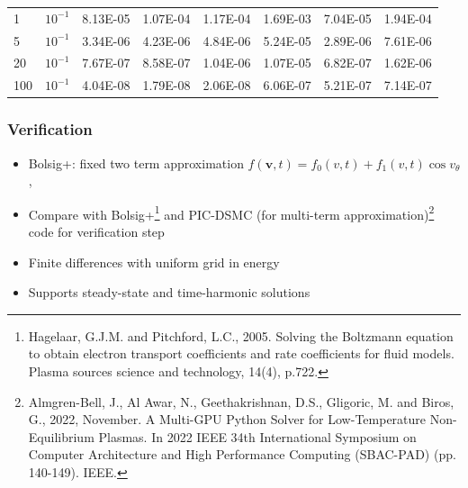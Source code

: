 \documentclass[mathserif, aspectratio=169]{beamer}
\newcommand{\vect}[1]{\boldsymbol{#1}}
\newcommand{\diff}[1]{\, d#1}
\begin{document}
\begin{frame}
\begin{table}[!tbhp]
\begin{tabular}{|p{1cm}|p{1cm}|c|c|c|c|c|c|}
		  1   &	$10^{-1}$ &	8.13E-05 &	1.07E-04 &	1.17E-04 &	1.69E-03 &	7.04E-05 &	1.94E-04\\
		  5   &	$10^{-1}$ &	3.34E-06 &	4.23E-06 &	4.84E-06 &	5.24E-05 &	2.89E-06 &	7.61E-06\\
		  20  &	$10^{-1}$ &	7.67E-07 &	8.58E-07 &	1.04E-06 &	1.07E-05 &	6.82E-07 &	1.62E-06\\
		  100 &	$10^{-1}$ &	4.04E-08 &	1.79E-08 &	2.06E-08 &	6.06E-07 &	5.21E-07 &	7.14E-07\\
		  \hline
		\end{tabular}
	  \end{table}
\end{frame}

\begin{frame}
	\frametitle{Verification}
	\begin{itemize}
		\item Bolsig+: fixed two term approximation $f(\vect{v},t) = f_0(v, t) + f_1(v,t)\cos v_\theta$, %
		\item Compare with Bolsig+\footnote[frame]{Hagelaar, G.J.M. and Pitchford, L.C., 2005. Solving the Boltzmann equation to obtain electron transport coefficients and rate coefficients for fluid models. Plasma sources science and technology, 14(4), p.722.} and PIC-DSMC (for multi-term approximation)\footnote[frame]{Almgren-Bell, J., Al Awar, N., Geethakrishnan, D.S., Gligoric, M. and Biros, G., 2022, November. A Multi-GPU Python Solver for Low-Temperature Non-Equilibrium Plasmas. In 2022 IEEE 34th International Symposium on Computer Architecture and High Performance Computing (SBAC-PAD) (pp. 140-149). IEEE.} code for verification step 
		\item Finite differences with uniform grid in energy
		\item Supports steady-state and time-harmonic solutions
	\end{itemize}
\end{frame}
\end{document}
